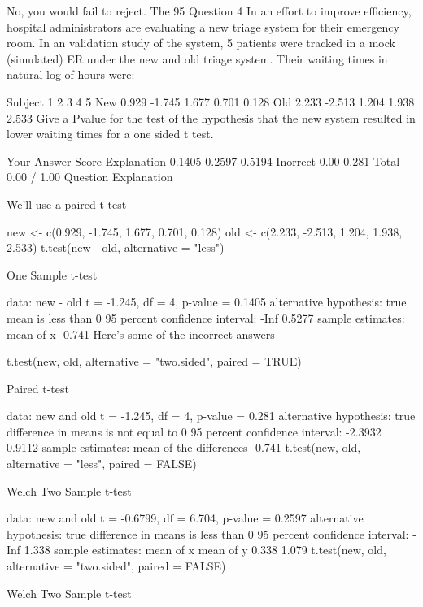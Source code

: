 No, you would fail to reject. The 95%
Question 4
In an effort to improve efficiency, hospital administrators are evaluating a new triage system for their emergency room. In an validation study of the system, 5 patients were tracked in a mock (simulated) ER under the new and old triage system. Their waiting times in natural log of hours were:

Subject	1	2	3	4	5
New	0.929	-1.745	1.677	0.701	0.128
Old	2.233	-2.513	1.204	1.938	2.533
Give a Pvalue for the test of the hypothesis that the new system resulted in lower waiting times for a one sided t test.

Your Answer		Score	Explanation
0.1405			
0.2597			
0.5194	Inorrect	0.00	
0.281			
Total		0.00 / 1.00	
Question Explanation

We'll use a paired t test

new <- c(0.929, -1.745, 1.677, 0.701, 0.128)
old <- c(2.233, -2.513, 1.204, 1.938, 2.533)
t.test(new - old, alternative = "less")

    One Sample t-test

data:  new - old 
t = -1.245, df = 4, p-value = 0.1405
alternative hypothesis: true mean is less than 0 
95 percent confidence interval:
   -Inf 0.5277 
sample estimates:
mean of x 
   -0.741 
Here's some of the incorrect answers

t.test(new, old, alternative = "two.sided", paired = TRUE)

    Paired t-test

data:  new and old 
t = -1.245, df = 4, p-value = 0.281
alternative hypothesis: true difference in means is not equal to 0 
95 percent confidence interval:
 -2.3932  0.9112 
sample estimates:
mean of the differences 
                 -0.741 
t.test(new, old, alternative = "less", paired = FALSE)

    Welch Two Sample t-test

data:  new and old 
t = -0.6799, df = 6.704, p-value = 0.2597
alternative hypothesis: true difference in means is less than 0 
95 percent confidence interval:
  -Inf 1.338 
sample estimates:
mean of x mean of y 
    0.338     1.079 
t.test(new, old, alternative = "two.sided", paired = FALSE)

    Welch Two Sample t-test

